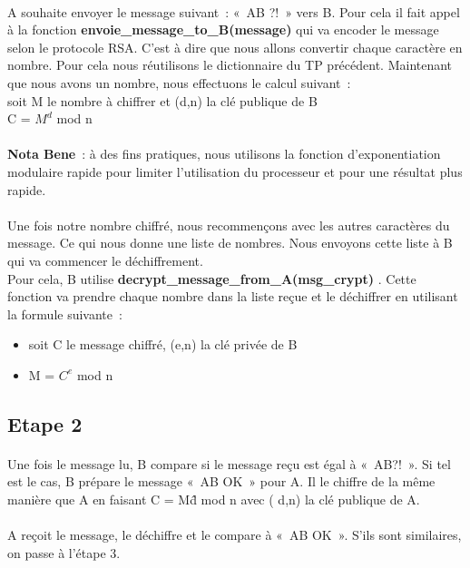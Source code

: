 \documentclass[11pt,fleqn]{book} %
\begin{document}
\paragraph{}A souhaite envoyer le message suivant : « AB ?! » vers B. Pour cela il fait appel à la fonction \textbf{envoie\_message\_to\_B(message)} qui va encoder le message selon le protocole RSA. C'est à dire que nous allons convertir chaque caractère en nombre. Pour cela nous réutilisons le dictionnaire du TP précédent. Maintenant que nous avons un nombre, nous effectuons le calcul suivant : 
\\soit M le nombre à chiffrer et (d,n) la clé publique de B
\\C = $M^d$ mod n
\\\\\textbf{Nota Bene} : à des fins pratiques, nous utilisons la fonction d'exponentiation modulaire rapide pour limiter l'utilisation du processeur et pour une résultat plus rapide.
\\\\Une fois notre nombre chiffré, nous recommençons avec les autres caractères du message. Ce qui nous donne une liste de nombres. Nous envoyons cette liste à B qui va commencer le déchiffrement.
\\Pour cela, B utilise \textbf{decrypt\_message\_from\_A(msg\_crypt)} . Cette fonction va prendre chaque nombre dans la liste reçue et le déchiffrer en utilisant la formule suivante : 
\begin{itemize}
 \item soit C le message chiffré, (e,n) la clé privée de B
 \item M = $C^e$ mod n
\end{itemize}

\subsection{Etape 2}
\paragraph{}Une fois le message lu, B compare si le message reçu est égal à « AB?! ». Si tel est le cas, B prépare le message « AB OK » pour A. Il le chiffre de la même manière que A en faisant C = M\^d mod n avec ( d,n) la clé publique de A.
\\\\A reçoit le message, le déchiffre et le compare à « AB OK ». S'ils sont similaires, on passe à l'étape 3.
\end{document}
